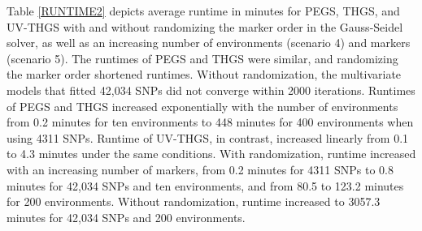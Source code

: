 \documentclass{bmcart}
\begin{document}
Table \ref{RUNTIME2} depicts average runtime in minutes for PEGS, THGS, and UV-THGS with and without randomizing the marker order in the Gauss-Seidel solver, as well as an increasing number of environments (scenario 4) and markers (scenario 5). The runtimes of PEGS and THGS were similar, and randomizing the marker order shortened runtimes. Without randomization, the multivariate models that fitted 42,034 SNPs did not converge within 2000 iterations.
Runtimes of PEGS and THGS increased exponentially with the number of environments from 0.2 minutes for ten environments to 448 minutes for 400 environments when using 4311 SNPs. Runtime of UV-THGS, in contrast, increased linearly from 0.1 to 4.3 minutes under the same conditions. With randomization, runtime increased with an increasing number of markers, from 0.2 minutes for 4311 SNPs to 0.8 minutes for 42,034 SNPs and ten environments, and from 80.5 to 123.2 minutes for 200 environments. Without randomization, runtime increased to 3057.3 minutes for 42,034 SNPs and 200 environments.
\end{document}
